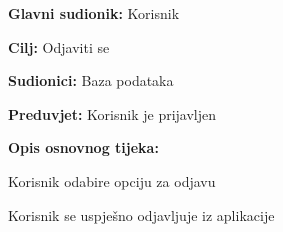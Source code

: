 		   \noindent {}
		   \begin{packed_item}
		   	
		   	\item \textbf{Glavni sudionik: } Korisnik
		   	\item  \textbf{Cilj:} Odjaviti se
		   	\item  \textbf{Sudionici:} Baza podataka
		   	\item  \textbf{Preduvjet:} Korisnik je prijavljen
		   	\item  \textbf{Opis osnovnog tijeka:} 
		   	
		   	\item[] \begin{packed_enum}
		   		
		   		\item Korisnik odabire opciju za odjavu
		   		\item Korisnik se uspješno odjavljuje iz aplikacije
		   		
		   	\end{packed_enum}
		   \end{packed_item}	 
	
